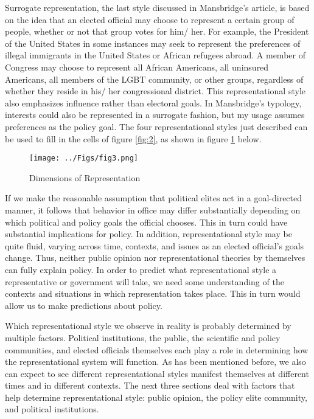 Surrogate representation, the last style discussed in Mansbridge's article, is based on the idea that an elected official may choose to represent a certain group of people, whether or not that group votes for him/ her. For example, the President of the United States in some instances may seek to represent the preferences of illegal immigrants in the United States or African refugees abroad. A member of Congress may choose to represent all African Americans, all uninsured Americans, all members of the LGBT community, or other groups, regardless of whether they reside in his/ her congressional district. This representational style also emphasizes influence rather than electoral goals. In Mansbridge's typology, interests could also be represented in a surrogate fashion, but my usage assumes preferences as the policy goal. The four representational styles just described can be used to fill in the cells of figure \ref{fig:2}, as shown in figure \ref{fig:3} below.

\begin{figure}[tb]
	\caption{Dimensions of Representation}
	\texttt{[image: ../Figs/fig3.png]}
	\label{fig:3}
\end{figure}

If we make the  reasonable assumption that political elites act in a goal-directed manner, it follows that behavior in office may differ substantially depending on which political and policy goals the official chooses. This in turn could have substantial implications for policy. In addition, representational style may be quite fluid, varying across time, contexts, and issues as an elected official's goals change. Thus, neither public opinion nor representational theories by themselves can fully explain policy. In order to predict what representational style a representative or government will take, we need some understanding of the contexts and situations in which representation takes place. This in turn would allow us to make predictions about policy.

Which representational style we observe in reality is probably determined by multiple factors. Political institutions, the public, the scientific and policy communities, and elected officials themselves each play a role in determining how the representational system will function. As has been mentioned before, we also can expect to see different representational styles manifest themselves at different times and in different contexts. The next three sections deal with factors that help determine representational style: public opinion, the policy elite community, and political institutions.

